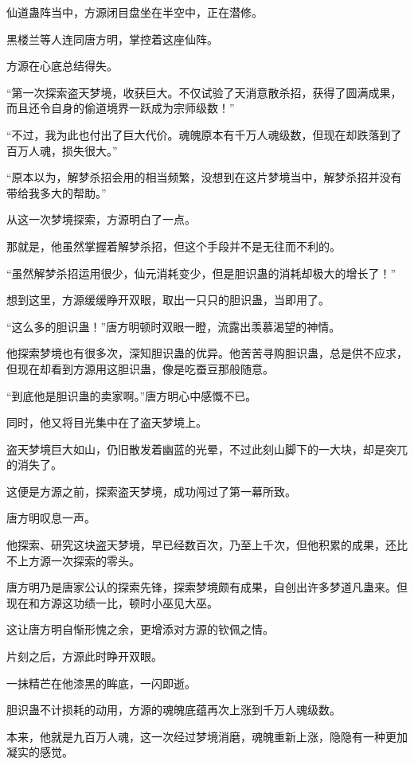
\begin{this_body}

仙道蛊阵当中，方源闭目盘坐在半空中，正在潜修。

黑楼兰等人连同唐方明，掌控着这座仙阵。

方源在心底总结得失。

“第一次探索盗天梦境，收获巨大。不仅试验了天消意散杀招，获得了圆满成果，而且还令自身的偷道境界一跃成为宗师级数！”

“不过，我为此也付出了巨大代价。魂魄原本有千万人魂级数，但现在却跌落到了百万人魂，损失很大。”

“原本以为，解梦杀招会用的相当频繁，没想到在这片梦境当中，解梦杀招并没有带给我多大的帮助。”

从这一次梦境探索，方源明白了一点。

那就是，他虽然掌握着解梦杀招，但这个手段并不是无往而不利的。

“虽然解梦杀招运用很少，仙元消耗变少，但是胆识蛊的消耗却极大的增长了！”

想到这里，方源缓缓睁开双眼，取出一只只的胆识蛊，当即用了。

“这么多的胆识蛊！”唐方明顿时双眼一瞪，流露出羡慕渴望的神情。

他探索梦境也有很多次，深知胆识蛊的优异。他苦苦寻购胆识蛊，总是供不应求，但现在却看到方源用这胆识蛊，像是吃蚕豆那般随意。

“到底他是胆识蛊的卖家啊。”唐方明心中感慨不已。

同时，他又将目光集中在了盗天梦境上。

盗天梦境巨大如山，仍旧散发着幽蓝的光晕，不过此刻山脚下的一大块，却是突兀的消失了。

这便是方源之前，探索盗天梦境，成功闯过了第一幕所致。

唐方明叹息一声。

他探索、研究这块盗天梦境，早已经数百次，乃至上千次，但他积累的成果，还比不上方源一次探索的零头。

唐方明乃是唐家公认的探索先锋，探索梦境颇有成果，自创出许多梦道凡蛊来。但现在和方源这功绩一比，顿时小巫见大巫。

这让唐方明自惭形愧之余，更增添对方源的钦佩之情。

片刻之后，方源此时睁开双眼。

一抹精芒在他漆黑的眸底，一闪即逝。

胆识蛊不计损耗的动用，方源的魂魄底蕴再次上涨到千万人魂级数。

本来，他就是九百万人魂，这一次经过梦境消磨，魂魄重新上涨，隐隐有一种更加凝实的感觉。


\end{this_body}
